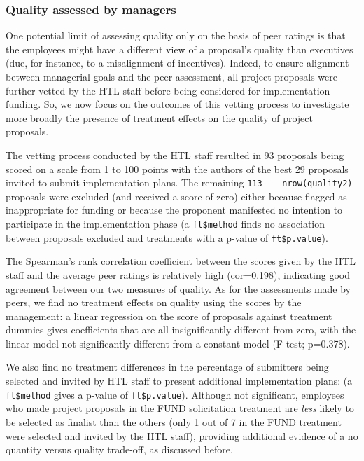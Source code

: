 \documentclass[11pt, titlepage]{article}
\begin{document}
\subsubsection{Quality assessed by
managers}\label{quality-assessed-by-managers}

One potential limit of assessing quality only on the basis of peer
ratings is that the employees might have a different view of a
proposal's quality than executives (due, for instance, to a misalignment
of incentives). Indeed, to ensure alignment between managerial goals and
the peer assessment, all project proposals were further vetted by the
HTL staff before being considered for implementation funding. So, we now
focus on the outcomes of this vetting process to investigate more
broadly the presence of treatment effects on the quality of project
proposals.

The vetting process conducted by the HTL staff resulted in 93 proposals
being scored on a scale from 1 to 100 points with the authors of the
best 29 proposals invited to submit implementation plans. The remaining
\texttt{113\ -\ \ nrow(quality2)} proposals were excluded (and received
a score of zero) either because flagged as inappropriate for funding or
because the proponent manifested no intention to participate in the
implementation phase (a \texttt{ft\$method} finds no association between
proposals excluded and treatments with a p-value of
\texttt{ft\$p.value}).

The Spearman's rank correlation coefficient between the scores given by
the HTL staff and the average peer ratings is relatively high
(cor=0.198), indicating good agreement between our two measures of
quality. As for the assessments made by peers, we find no treatment
effects on quality using the scores by the management: a linear
regression on the score of proposals against treatment dummies gives
coefficients that are all insignificantly different from zero, with the
linear model not significantly different from a constant model (F-test;
p=0.378).

We also find no treatment differences in the percentage of submitters
being selected and invited by HTL staff to present additional
implementation plans: (a \texttt{ft\$method} gives a p-value of
\texttt{ft\$p.value}). Although not significant, employees who made
project proposals in the FUND solicitation treatment are \emph{less}
likely to be selected as finalist than the others (only 1 out of 7 in
the FUND treatment were selected and invited by the HTL staff),
providing additional evidence of a no quantity versus quality trade-off,
as discussed before.
\end{document}
